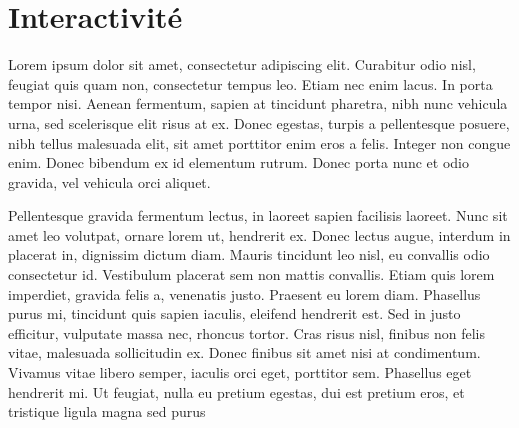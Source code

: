 \chapter{Interactivité}
\label{s:interactivite}

Lorem ipsum dolor sit amet, consectetur adipiscing elit. Curabitur odio nisl, feugiat quis quam non, consectetur tempus leo. Etiam nec enim lacus. In porta tempor nisi. Aenean fermentum, sapien at tincidunt pharetra, nibh nunc vehicula urna, sed scelerisque elit risus at ex. Donec egestas, turpis a pellentesque posuere, nibh tellus malesuada elit, sit amet porttitor enim eros a felis. Integer non congue enim. Donec bibendum ex id elementum rutrum. Donec porta nunc et odio gravida, vel vehicula orci aliquet.

Pellentesque gravida fermentum lectus, in laoreet sapien facilisis laoreet. Nunc sit amet leo volutpat, ornare lorem ut, hendrerit ex. Donec lectus augue, interdum in placerat in, dignissim dictum diam. Mauris tincidunt leo nisl, eu convallis odio consectetur id. Vestibulum placerat sem non mattis convallis. Etiam quis lorem imperdiet, gravida felis a, venenatis justo. Praesent eu lorem diam. Phasellus purus mi, tincidunt quis sapien iaculis, eleifend hendrerit est. Sed in justo efficitur, vulputate massa nec, rhoncus tortor. Cras risus nisl, finibus non felis vitae, malesuada sollicitudin ex. Donec finibus sit amet nisi at condimentum. Vivamus vitae libero semper, iaculis orci eget, porttitor sem. Phasellus eget hendrerit mi. Ut feugiat, nulla eu pretium egestas, dui est pretium eros, et tristique ligula magna sed purus